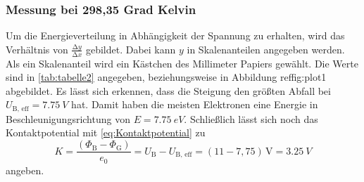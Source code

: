 \subsubsection*{Messung bei 298,35 Grad Kelvin}
Um die Energieverteilung in Abhängigkeit der Spannung zu erhalten, wird das Verhältnis von $\frac{\increment y}{\increment x}$ gebildet.
Dabei kann $y$ in Skalenanteilen angegeben werden.
Als ein Skalenanteil wird ein Kästchen des Millimeter Papiers gewählt.
Die Werte sind in \autoref{tab:tabelle2} angegeben, beziehungsweise in Abbildung ref{fig:plot1} abgebildet.
Es lässt sich erkennen, dass die Steigung den größten Abfall bei $U_\text{B, eff} = \qty{7.75}{V}$ hat.
Damit haben die meisten Elektronen eine Energie in Beschleunigungsrichtung von $E = \qty{7.75}{eV}$.
Schließlich lässt sich noch das Kontaktpotential mit \autoref{eq:Kontaktpotential} zu
\begin{equation}
  K = \frac{\left( \Phi_\text{B} - \Phi_\text{G} \right)}{e_0} = U_\text{B} - U_\text{B, eff} = (11 - 7,75) \, \unit\V = \qty{3.25}{V}
\end{equation}
angeben.



